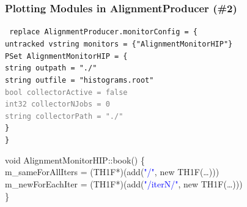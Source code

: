 \documentclass[compress]{beamer}
\begin{document}
\begin{frame}
\frametitle{Plotting Modules in AlignmentProducer (\#2)}

\tt \small
replace AlignmentProducer.monitorConfig = \{ \\
\mbox{\hspace{0.5 cm}}untracked vstring monitors = \{"AlignmentMonitorHIP"\} \\
\mbox{\hspace{0.5 cm}}PSet AlignmentMonitorHIP = \{ \\
\mbox{\hspace{0.5 cm}}\mbox{\hspace{0.5 cm}}string outpath = "./" \\
\mbox{\hspace{0.5 cm}}\mbox{\hspace{0.5 cm}}string outfile = "histograms.root" \\
\mbox{\hspace{0.5 cm}}\mbox{\hspace{0.5 cm}}\textcolor{gray}{bool collectorActive = false} \\
\mbox{\hspace{0.5 cm}}\mbox{\hspace{0.5 cm}}\textcolor{gray}{int32 collectorNJobs = 0} \\
\mbox{\hspace{0.5 cm}}\mbox{\hspace{0.5 cm}}\textcolor{gray}{string collectorPath = "./"} \\
\mbox{\hspace{0.5 cm}}\} \\
\}

\vfill
void AlignmentMonitorHIP::book() \{ \\
\mbox{\hspace{0.3 cm}}m\_sameForAllIters = (TH1F*)(add(\textcolor{blue}{"/"}, new TH1F(\ldots))) \\
\mbox{\hspace{0.3 cm}}m\_newForEachIter = (TH1F*)(add(\textcolor{blue}{"/iterN/"}, new TH1F(\ldots))) \\
\}
\end{frame}
\end{document}
